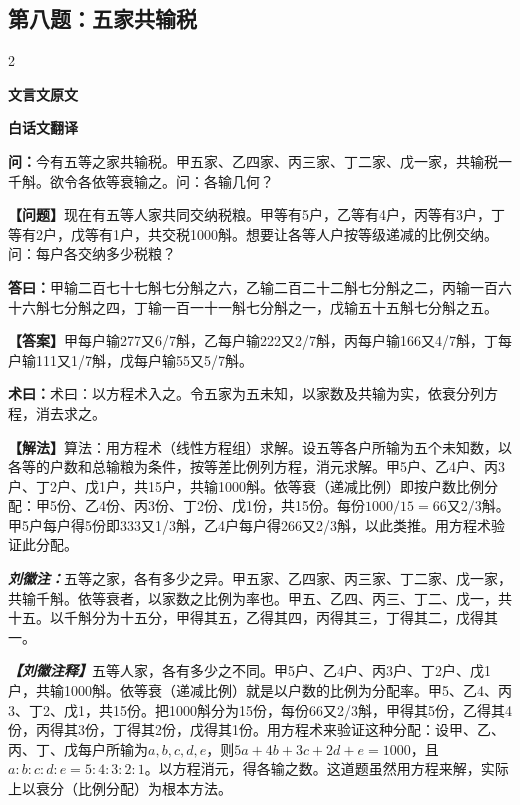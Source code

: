 \documentclass[10pt,a4paper]{article}
\newcommand{\wen}[1]{\textbf{\color{problemcolor}问：}#1\par}
\newcommand{\da}[1]{\textbf{答曰：}#1\par}
\newcommand{\shu}[1]{\textbf{术曰：}#1\par}
\newcommand{\liuhui}[1]{{\color{commentarycolor}\textit{\textbf{刘徽注：}}#1\par}}
\newcommand{\classicalheader}[1]{{\centering\large\bfseries\color{classicalcolor} #1\par\vspace{0.5em}}}
\newcommand{\wenmodern}[1]{\textbf{\color{moderncolor}【问题】}#1\par}
\newcommand{\damodern}[1]{\textbf{【答案】}#1\par}
\newcommand{\shumodern}[1]{\textbf{【解法】}#1\par}
\newcommand{\liuhuimodern}[1]{{\color{commentarycolor}\textit{\textbf{【刘徽注释】}}#1\par}}
\newcommand{\modernheader}[1]{{\centering\large\bfseries\color{moderncolor} #1\par\vspace{0.5em}}}
\newcommand{\problemsec}[1]{\subsection*{#1}}
\begin{document}
\problemsec{第八题：五家共输税}
\begin{paracol}{2}
\classicalheader{文言文原文}
\switchcolumn
\modernheader{白话文翻译}
\switchcolumn*

\wen{今有五等之家共输税。甲五家、乙四家、丙三家、丁二家、戊一家，共输税一千斛。欲令各依等衰输之。问：各输几何？}

\switchcolumn

\wenmodern{现在有五等人家共同交纳税粮。甲等有5户，乙等有4户，丙等有3户，丁等有2户，戊等有1户，共交税1000斛。想要让各等人户按等级递减的比例交纳。问：每户各交纳多少税粮？}

\switchcolumn*

\da{甲输二百七十七斛七分斛之六，乙输二百二十二斛七分斛之二，丙输一百六十六斛七分斛之四，丁输一百一十一斛七分斛之一，戊输五十五斛七分斛之五。}

\switchcolumn

\damodern{甲每户输277又6/7斛，乙每户输222又2/7斛，丙每户输166又4/7斛，丁每户输111又1/7斛，戊每户输55又5/7斛。}

\switchcolumn*

\shu{术曰：以方程术入之。令五家为五未知，以家数及共输为实，依衰分列方程，消去求之。}

\switchcolumn

\shumodern{算法：用方程术（线性方程组）求解。设五等各户所输为五个未知数，以各等的户数和总输粮为条件，按等差比例列方程，消元求解。甲5户、乙4户、丙3户、丁2户、戊1户，共15户，共输1000斛。依等衰（递减比例）即按户数比例分配：甲5份、乙4份、丙3份、丁2份、戊1份，共15份。每份$1000/15=66$又$2/3$斛。甲5户每户得5份即333又1/3斛，乙4户每户得266又2/3斛，以此类推。用方程术验证此分配。}

\switchcolumn*

\liuhui{五等之家，各有多少之异。甲五家、乙四家、丙三家、丁二家、戊一家，共输千斛。依等衰者，以家数之比例为率也。甲五、乙四、丙三、丁二、戊一，共十五。以千斛分为十五分，甲得其五，乙得其四，丙得其三，丁得其二，戊得其一。}

\switchcolumn

\liuhuimodern{五等人家，各有多少之不同。甲5户、乙4户、丙3户、丁2户、戊1户，共输1000斛。依等衰（递减比例）就是以户数的比例为分配率。甲5、乙4、丙3、丁2、戊1，共15份。把1000斛分为15份，每份66又2/3斛，甲得其5份，乙得其4份，丙得其3份，丁得其2份，戊得其1份。用方程术来验证这种分配：设甲、乙、丙、丁、戊每户所输为$a,b,c,d,e$，则$5a+4b+3c+2d+e=1000$，且$a:b:c:d:e=5:4:3:2:1$。以方程消元，得各输之数。这道题虽然用方程来解，实际上以衰分（比例分配）为根本方法。}

\end{paracol}
\end{document}
